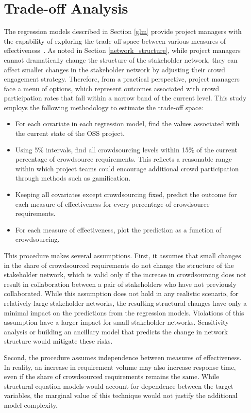 \section{Trade-off Analysis}
\label{trade-off}

The regression models described in Section \ref{glm} provide project managers with the capability of exploring the trade-off space between various measures of effectiveness~\cite{parnell}. As noted in Section \ref{network_structure}, while project managers cannot dramatically change the structure of the stakeholder network, they can affect smaller changes in the stakeholder network by adjusting their crowd engagement strategy. Therefore, from a practical perspective, project managers face a menu of options, which represent outcomes associated with crowd participation rates that fall within a narrow band of the current level. This study employs the following methodology to estimate the trade-off space:

\begin{itemize}
    \item For each covariate in each regression model, find the values associated with the current state of the OSS project.
    \item Using 5\% intervals, find all crowdsourcing levels within 15\% of the current percentage of crowdsource requirements. This reflects a reasonable range within which project teams could encourage additional crowd participation through methods such as gamification. 
    \item Keeping all covariates except crowdsourcing fixed, predict the outcome for each measure of effectiveness for every percentage of crowdsource requirements.
    \item For each measure of effectiveness, plot the prediction as a function of crowdsourcing.
\end{itemize}

This procedure makes several assumptions. First, it assumes that small changes in the share of crowdsourced requirements do not change the structure of the stakeholder network, which is valid only if the increase in crowdsourcing does not result in collaboration between a pair of stakeholders who have not previously collaborated. While this assumption does not hold in any realistic scenario, for relatively large stakeholder networks, the resulting structural changes have only a minimal impact on the predictions from the regression models. Violations of this assumption have a larger impact for small stakeholder networks. Sensitivity analysis or building an ancillary model that predicts the change in network structure would mitigate these risks. 

Second, the procedure assumes independence between measures of effectiveness. In reality, an increase in requirement volume may also increase response time, even if the share of crowdsourced requirements remains the same. While structural equation models \cite{ullman} would account for dependence between the target variables, the marginal value of this technique would not justify the additional model complexity.